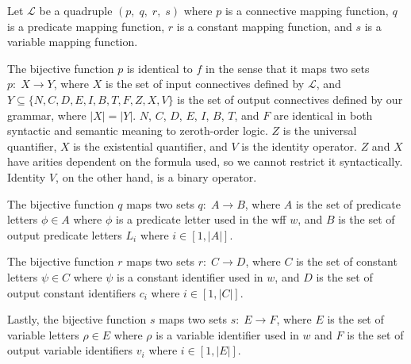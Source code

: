 \documentclass[ms]{uncgdissertationexp2}
\theoremstyle{plain}
\theoremstyle{definition}
\theoremstyle{remark}
\begin{document}
Let $\mathcal{L}$ be a quadruple $(p,\;q,\;r,\;s)$ where $p$ is a connective mapping function, $q$ is a predicate mapping function, $r$ is a constant mapping function, and $s$ is a variable mapping function. 

The bijective function $p$ is identical to $f$ in the sense that it maps two sets $p:\;X \to Y$, where $X$ is the set of input connectives defined by $\mathcal{L}$, and $Y \subseteq \{N, C, D, E, I, B, T, F, Z, X, V\}$ is the set of output connectives defined by our grammar, where $|X| = |Y|$. $N$, $C$, $D$, $E$, $I$, $B$, $T$, and $F$ are identical in both syntactic and semantic meaning to zeroth-order logic. $Z$ is the universal quantifier, $X$ is the existential quantifier, and $V$ is the identity operator. $Z$ and $X$ have arities dependent on the formula used, so we cannot restrict it syntactically. Identity $V$, on the other hand, is a binary operator.

The bijective function $q$ maps two sets $q:\;A \to B$, where $A$ is the set of predicate letters $\phi \in A$ where $\phi$ is a predicate letter used in the wff $w$, and $B$ is the set of output predicate letters $L_{i}$ where $i \in [1, |A|]$.

The bijective function $r$ maps two sets $r:\;C \to D$, where $C$ is the set of constant letters $\psi \in C$ where $\psi$ is a constant identifier used in $w$, and $D$ is the set of output constant identifiers $c_{i}$ where $i \in [1, |C|]$.

Lastly, the bijective function $s$ maps two sets $s:\;E \to F$, where $E$ is the set of variable letters $\rho \in E$ where $\rho$ is a variable identifier used in $w$ and $F$ is the set of output variable identifiers $v_{i}$ where $i \in [1, |E|]$.
\end{document}
